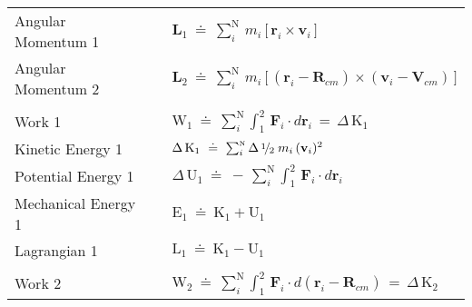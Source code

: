 \documentclass[10pt]{article}
\newcommand{\med}{\raise.5ex\hbox{$\scriptstyle 1$}\kern-.15em/\kern-.09em\lower.25ex\hbox{$\scriptstyle 2$}}
\begin{document}
\begin{tabular}{lll}
Angular Momentum 1 & \hspace{+0.00em} & ${\mathbf{L}}_1 ~\doteq~ \sum_i^{\scriptscriptstyle{\mathrm{N}}} \, m_i \, \big [ \, {\mathbf{r}}_{i} \times {\mathbf{v}}_{i} \, \big ]$ \vspace{+0.99em} \\
Angular Momentum 2 & \hspace{+0.00em} & ${\mathbf{L}}_2 ~\doteq~ \sum_i^{\scriptscriptstyle{\mathrm{N}}} \, m_i \, \big [ \, ({\mathbf{r}}_{i} - {\mathbf{R}}_{cm}) \times ({\mathbf{v}}_{i} - {\mathbf{V}}_{cm}) \, \big ]$ \vspace{+0.99em} \\
\\
Work 1 & \hspace{+0.00em} & ${\mathrm{W}}_1 ~\doteq~ \sum_i^{\scriptscriptstyle{\mathrm{N}}} \int_{\scriptscriptstyle 1}^{\scriptscriptstyle 2} \, {\mathbf{F}}_i \cdot d{\mathbf{r}}_{i} \,=\, \Delta \, {\mathrm{K}}_1$ \vspace{+0.99em} \\
Kinetic Energy 1 & \hspace{+0.00em} & $\Delta \, {\mathrm{K}}_1 ~\doteq~ \sum_i^{\scriptscriptstyle{\mathrm{N}}} \Delta \, \med \; m_i \, ({\mathbf{v}}_{i})^2$ \vspace{+0.99em} \\
Potential Energy 1 & \hspace{+0.00em} & $\Delta \, {\mathrm{U}}_1 ~\doteq~ - \, \sum_i^{\scriptscriptstyle{\mathrm{N}}} \int_{\scriptscriptstyle 1}^{\scriptscriptstyle 2} \, {\mathbf{F}}_i \cdot d{\mathbf{r}}_{i}$ \vspace{+0.99em} \\
Mechanical Energy 1 & \hspace{+0.00em} & ${\mathrm{E}}_1 ~\doteq~ {\mathrm{K}}_1 + {\mathrm{U}}_1$ \vspace{+0.99em} \\
Lagrangian 1 & \hspace{+0.00em} & ${\mathrm{L}}_1 ~\doteq~ {\mathrm{K}}_1 - {\mathrm{U}}_1$ \vspace{+0.99em} \\
\\
Work 2 & \hspace{+0.00em} & ${\mathrm{W}}_2 ~\doteq~ \sum_i^{\scriptscriptstyle{\mathrm{N}}} \int_{\scriptscriptstyle 1}^{\scriptscriptstyle 2} \, {\mathbf{F}}_i \cdot d({\mathbf{r}}_{i} - {\mathbf{R}}_{cm}) \,=\, \Delta \, {\mathrm{K}}_2$ \vspace{+0.99em} \\

\end{tabular}
\end{document}
